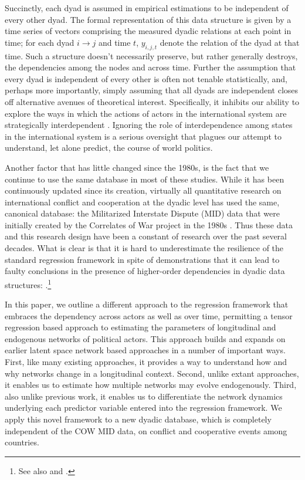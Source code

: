 \documentclass[3p,times,twocolumn,authoryear,12pt]{elsarticle}
\begin{document}
Succinctly, each dyad is assumed in empirical estimations to be independent of every other dyad. The formal representation of this data structure is given by a time series of vectors comprising the measured dyadic relations at each point in time; for each dyad $i\rightarrow j$ and time $t$, $y_{i,j,t}$ denote the relation of the dyad at that time. Such a structure doesn't necessarily preserve, but rather generally destroys, the dependencies among the nodes and across time. Further the assumption that every dyad is independent of every other is often not tenable statistically, and, perhaps more importantly, simply assuming that all dyads are independent closes off alternative avenues of theoretical interest. Specifically, it inhibits our ability to explore the ways in which the actions of actors in the international system are strategically interdependent \citep{signorino:1999}. Ignoring the role of interdependence among states in the international system is a serious oversight that plagues our attempt to understand, let alone predict, the course of world politics. 

Another factor that has little changed since the 1980s, is the fact that we continue to use the same database in most of these studies. While it has been continuously updated since its creation, virtually all quantitative research on international conflict and cooperation at the dyadic level has used the same, canonical database: the Militarized Interstate Dispute (MID) data that were initially created by the Correlates of War project in the 1980s \citep{palmer:etal:2015}. Thus these data and this research design have been a constant of research over the past several decades. What is clear is that it is hard to underestimate the resilience of the standard regression framework in spite of demonstrations that it can lead to faulty conclusions in the presence of higher-order dependencies in dyadic data structures: \cite{krackhardt:1988,hoff:raftery:etal:2002}.\footnote{See also \cite{cranmer:desmarais:2011} and \cite{snijders:koskinen:etal:2012}.}  

In this paper, we outline a different approach to the regression framework that embraces the dependency across actors as well as over time, permitting a tensor regression based approach to estimating the parameters of longitudinal and endogenous networks of political actors. This approach builds and expands on earlier latent space network based approaches in a number of important ways. First, like many existing approaches, it provides a way to understand how and why networks change in a longitudinal context. Second, unlike extant approaches, it enables us to estimate how multiple networks may evolve endogenously. Third, also unlike previous work, it enables us to differentiate the network dynamics underlying each predictor variable entered into the regression framework. We apply this novel framework to a new dyadic database, which is completely independent of the COW MID data, on conflict and cooperative events among countries.
\end{document}

